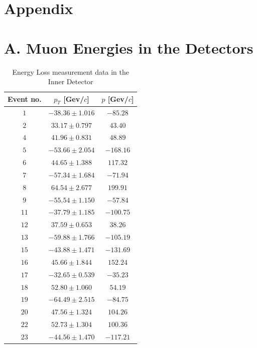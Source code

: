 \section{Appendix}
\label{sec:appendix}

\section{A. Muon Energies in the Detectors}

\begin{table}[h]
		\centering
        \begin{tabular}{ccc}
            \toprule
             Event no. & $p_T$ [Gev/$c$] & $p$ [Gev/$c$] \\
            \midrule
            $1 $ & $-38.36 \pm 1.016$ & $-85.28$ \\
  			\midrule
  			$2 $ & $ 33.17 \pm 0.797$ & $ 43.40$ \\
  			\midrule
  			$4 $ & $ 41.96 \pm 0.831$ & $ 48.89$ \\
  			\midrule
  			$5 $ & $-53.66 \pm 2.054$ & $-168.16$ \\
  			\midrule
  			$6 $ & $ 44.65 \pm 1.388$ & $ 117.32$ \\
  			\midrule
  			$7 $ & $-57.34 \pm 1.684$ & $-71.94$ \\
  			\midrule
  			$8 $ & $ 64.54 \pm 2.677$ & $ 199.91$ \\
  			\midrule
  			$9 $ & $-55.54 \pm 1.150$ & $-57.84$ \\
  			\midrule
  			$11$ & $-37.79 \pm 1.185$ & $-100.75$ \\
  			\midrule
  			$12$ & $ 37.59 \pm 0.653$ & $ 38.26$ \\
  			\midrule
  			$13$ & $-59.88 \pm 1.766$ & $-105.19$ \\
  			\midrule
  			$15$ & $-43.88 \pm 1.471$ & $-131.69$ \\
  			\midrule
  			$16$ & $ 45.66 \pm 1.844$ & $ 152.24$ \\
  			\midrule
  			$17$ & $-32.65 \pm 0.539$ & $-35.23$ \\
  			\midrule
  			$18$ & $ 52.80 \pm 1.060$ & $ 54.19$ \\
  			\midrule
  			$19$ & $-64.49 \pm 2.515$ & $-84.75$ \\
  			\midrule
  			$20$ & $ 47.56 \pm 1.324$ & $ 104.26$ \\
  			\midrule
  			$22$ & $ 52.73 \pm 1.304$ & $ 100.36$ \\
  			\midrule
  			$23$ & $-44.56 \pm 1.470$ & $-117.21$ \\
			\bottomrule
        \end{tabular}
        \caption{Energy Loss measurement data in the Inner Detector}
        \label{tab:innerdetector}
    \end{table}
\FloatBarrier

